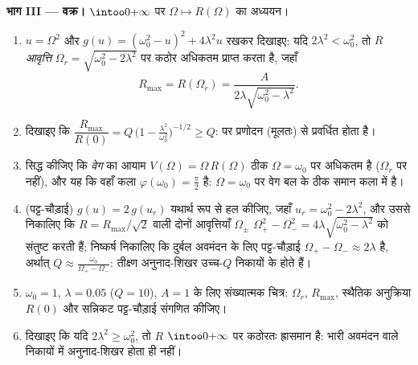 \begin{problem}
\medskip \noindent\textbf{भाग III ---  वक्र।} $\intoo0{+\infty}$ पर
$\Omega \mapsto R(\Omega)$ का अध्ययन।
\begin{enumerate}[resume]
  \item $u = \Omega^2$ और $g(u) = (\omega_0^2 - u)^2 + 4\lambda^2 u$ रखकर
  दिखाइए: यदि $2\lambda^2 < \omega_0^2$, तो $R$ \emph{ आवृत्ति}
  $\Omega_r = \sqrt{\omega_0^2 - 2\lambda^2}$ पर कठोर अधिकतम प्राप्त करता
  है, जहाँ
        \[
        R_{\max} = R(\Omega_r)
        = \frac{A}{2\lambda\sqrt{\omega_0^2 - \lambda^2}} .
        \]
  \item दिखाइए कि $\dfrac{R_{\max}}{R(0)} = Q\,\bigl(1 -
  \tfrac{\lambda^2}{\omega_0^2}\bigr)^{-1/2} \geq Q$:  पर प्रणोदन
  (मूलतः)  से प्रवर्धित होता है।
  \item सिद्ध कीजिए कि \emph{वेग} का आयाम $V(\Omega) = \Omega\,R(\Omega)$
  ठीक $\Omega = \omega_0$ पर अधिकतम है ($\Omega_r$ पर नहीं), और यह कि वहाँ
  कला $\varphi(\omega_0) = \frac\pi2$ है: $\Omega = \omega_0$ पर वेग बल के
  ठीक समान कला में है।
  \item (पट्ट-चौड़ाई) $g(u) = 2\,g(u_r)$ यथार्थ रूप से हल कीजिए, जहाँ $u_r =
  \omega_0^2 - 2\lambda^2$, और उससे निकालिए कि $R = R_{\max}/\sqrt2$ वाली
  दोनों आवृत्तियाँ $\Omega_\pm$ $\Omega_+^2 - \Omega_-^2 =
  4\lambda\sqrt{\omega_0^2 - \lambda^2}$ को संतुष्ट करती हैं; निष्कर्ष
  निकालिए कि दुर्बल अवमंदन के लिए पट्ट-चौड़ाई $\Omega_+ - \Omega_- \approx
  2\lambda$ है, अर्थात् $Q \approx \frac{\omega_0}{\Omega_+ - \Omega_-}$:
  तीक्ष्ण अनुनाद-शिखर उच्च-$Q$ निकायों के होते हैं।
  \item $\omega_0 = 1$, $\lambda = 0.05$ ($Q = 10$), $A = 1$ के लिए
  संख्यात्मक चित्र: $\Omega_r$, $R_{\max}$, स्थैतिक अनुक्रिया $R(0)$ और
  सन्निकट पट्ट-चौड़ाई संगणित कीजिए।
  \item दिखाइए कि यदि $2\lambda^2 \geq \omega_0^2$, तो $R$
  $\intoo0{+\infty}$ पर कठोरतः ह्रासमान है: भारी अवमंदन वाले निकायों में
  अनुनाद-शिखर होता ही नहीं।
\end{enumerate}


\end{problem}
